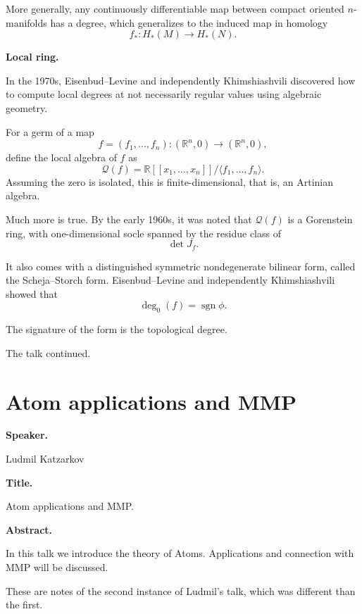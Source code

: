 \medskip\noindent
More generally, any continuously
differentiable map between compact
oriented $n$-manifolds has a degree,
which generalizes to the induced map
in homology
\[
f_*:H_*(M)\to H_*(N).
\]

\medskip\noindent
{\bf Local ring.}

\medskip\noindent
In the 1970s, Eisenbud--Levine and
independently Khimshiashvili
discovered how to compute local
degrees at not necessarily regular
values using algebraic geometry.

\medskip\noindent
For a germ of a map
\[
f=(f_1,\dots,f_n):(\mathbb R^n,0)
\to(\mathbb R^n,0),
\]
define the local algebra of $f$ as
\[
\mathcal Q(f)=
\mathbb R[[x_1,\dots,x_n]]/
\langle f_1,\dots,f_n\rangle.
\]
Assuming the zero is isolated, this
is finite-dimensional, that is, an
Artinian algebra.

\medskip\noindent
Much more is true.
By the early 1960s, it was noted
that $\mathcal Q(f)$ is a Gorenstein
ring, with one-dimensional socle
spanned by the residue class of
\[
\det J_f.
\]

\medskip\noindent
It also comes with a distinguished
symmetric nondegenerate bilinear
form, called the Scheja--Storch
form.
Eisenbud--Levine and independently
Khimshiashvili showed that
\[
\deg_0(f)=\operatorname{sgn}\phi.
\]

\begin{theorem}[EKL]
\label{theorem-signature-form}
The signature of the form is the
topological degree.
\end{theorem}

\medskip\noindent
The talk continued.


\section{Atom applications and
MMP}
\label{section-atom-applications-and-
mmp2}

\medskip\noindent
{\bf Speaker.}

Ludmil Katzarkov

\medskip\noindent
{\bf Title.}

Atom applications and MMP.

\medskip\noindent
{\bf Abstract.}

In this talk we introduce the
theory of Atoms.
Applications and connection with
MMP will be discussed.

\medskip\noindent
These are notes of the second instance
of Ludmil's talk, which was different
than the first.

